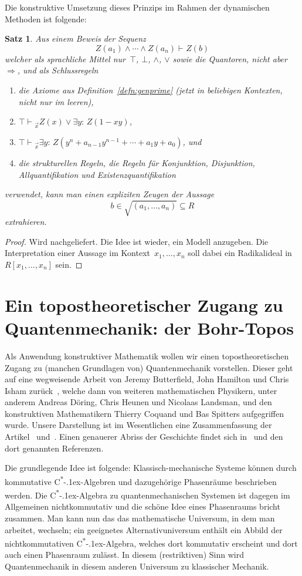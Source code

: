 \documentclass[a4paper,ngerman,12pt]{scrartcl}
\theoremstyle{definition}
\theoremstyle{plain}
\newtheorem{satz}[defn]{Satz}
\theoremstyle{remark}
\newcommand{\csalgebra}{C\textsuperscript{*}\kern-.1ex-Algebra}
\newcommand{\csalgebren}{C\textsuperscript{*}\kern-.1ex-Alge\-bren}
\newcommand{\seq}[1]{\mathrel{\vdash\!\!\!_{#1}}}
\renewcommand{\_}{\mathpunct{.}\,}
\newcommand{\?}{\,{:}\,}
\begin{document}
Die konstruktive Umsetzung dieses Prinzips im Rahmen der dynamischen Methoden
ist folgende:

\begin{satz}
Aus einem Beweis der Sequenz
\[ Z(a_1) \wedge \cdots \wedge Z(a_n) \seq{} Z(b) \]
welcher als sprachliche Mittel nur~$\top$, $\bot$, $\wedge$, $\vee$ sowie die
Quantoren, nicht aber~$\Rightarrow$, und als Schlussregeln
\begin{enumerate}
\item[1.] die Axiome aus Definition~\ref{defn:genprime} (jetzt in beliebigen
Kontexten, nicht nur im leeren),
\item[2.] $\top \seq{\vec x} Z(x) \vee \exists y{:}\, Z(1-xy)$,
\item[3.] $\top \seq{\vec x} \exists y{:}\, Z(y^n + a_{n-1}y^{n-1} + \cdots +
a_1y + a_0)$, und
\item[4.] die strukturellen Regeln, die Regeln für Konjunktion, Disjunktion,
Allquantifikation und Existenzquantifikation
\end{enumerate}
verwendet, kann man einen expliziten Zeugen der Aussage
\[ b \in \sqrt{(a_1,\ldots,a_n)} \subseteq R \]
extrahieren.
\end{satz}
\begin{proof}Wird nachgeliefert. Die Idee ist wieder, ein Modell anzugeben. Die
Interpretation einer Aussage im Kontext~$x_1,\ldots,x_n$ soll dabei ein
Radikalideal in~$R[x_1,\ldots,x_n]$ sein.\end{proof}


\section{Ein topostheoretischer Zugang zu Quantenmechanik: der Bohr-Topos}

Als Anwendung konstruktiver Mathematik wollen wir einen topostheoretischen
Zugang zu (manchen Grundlagen von) Quantenmechanik vorstellen. Dieser geht auf
eine wegweisende Arbeit von Jeremy Butterfield, John Hamilton und Chris Isham
zurück~\cite{butterfield:hamilton:isham:1}, welche dann von weiteren
mathematischen Physikern, unter anderem Andreas Döring, Chris Heunen und Nicolaas
Landsman, und den konstruktiven Mathematikern Thierry Coquand und Bas Spitters
aufgegriffen wurde. Unsere Darstellung ist im Wesentlichen eine Zusammenfassung
der Artikel~\cite{topos:aqt} und~\cite{nlab:bohrtopos}. Einen genauerer Abriss
der Geschichte findet sich in~\cite{nlab:bohrtopos} und den dort genannten
Referenzen.

Die grundlegende Idee ist folgende:
Klassisch-mechanische Systeme können durch kommutative \csalgebren{} und
dazugehörige Phasenräume beschrieben werden. Die \csalgebra{} zu
quantenmechanischen Systemen ist dagegen im Allgemeinen nichtkommutativ und die
schöne Idee eines Phasenraums bricht zusammen. Man kann nun das das
mathematische Universum, in dem man arbeitet, wechseln; ein geeignetes
Alternativuniversum enthält ein Abbild der nichtkommutativen \csalgebra,
welches dort kommutativ erscheint und dort auch einen Phasenraum zulässt. In
diesem (restriktiven) Sinn wird Quantenmechanik in diesem anderen Universum zu
klassischer Mechanik.
\end{document}
